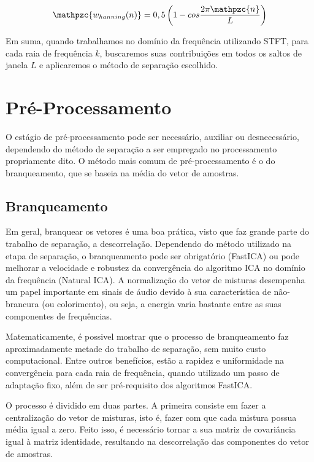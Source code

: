         \begin{equation}\label{eq:hanning}
            \mathpzc{w_{hanning}(n)} = 0,5 \left( 1 - cos\frac{2\pi\mathpzc{n}}{L}\right)
        \end{equation}
        
        Em suma, quando trabalhamos no domínio da frequência utilizando STFT, para cada raia de frequência $k$, buscaremos suas contribuições em todos os saltos de janela $L$ e aplicaremos o método de separação escolhido.
        
\section{Pré-Processamento}
        O estágio de pré-processamento pode ser necessário, auxiliar ou desnecessário, dependendo do método de separação a ser empregado no processamento propriamente dito. O método mais comum de pré-processamento é o do branqueamento, que se baseia na média do vetor de amostras.
    
    \subsection{Branqueamento} \label{sec:whitening}
        Em geral, branquear os vetores é uma boa prática, visto que faz grande parte do trabalho de separação, a descorrelação. Dependendo do método utilizado na etapa de separação, o branqueamento pode ser obrigatório (FastICA) ou pode melhorar a velocidade e robustez da convergência do algoritmo ICA no domínio da frequência (Natural ICA). A normalização do vetor de misturas desempenha um papel importante em sinais de áudio devido à sua característica de não-brancura (ou colorimento), ou seja, a energia varia bastante entre as suas componentes de frequências.
        
        Matematicamente, é possivel mostrar que o processo de branqueamento faz aproximadamente metade do trabalho de separação, sem muito custo computacional. Entre outros benefícios, estão a rapidez e uniformidade na convergência para cada raia de frequência, quando utilizado um passo de adaptação fixo, além de ser pré-requisito dos algoritmos FastICA.
        
        O processo é dividido em duas partes. A primeira consiste em fazer a centralização do vetor de misturas, isto é, fazer com que cada mistura possua média igual a zero. Feito isso, é necessário tornar a sua matriz de covariância igual à matriz identidade, resultando na descorrelação das componentes do vetor de amostras.
        
